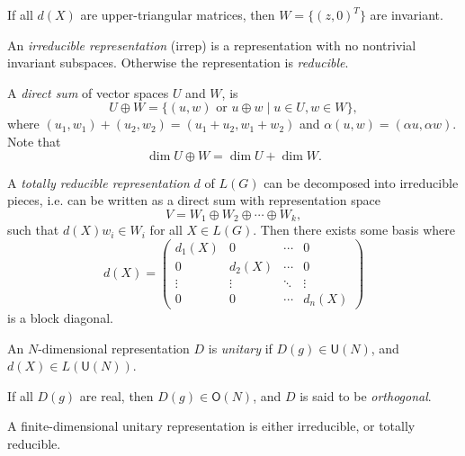 \documentclass[12pt]{article}
\begin{document}
\begin{exbox}
	If all $d(X)$ are upper-triangular matrices, then $W = \{(z, 0)^{T}\}$ are invariant.
\end{exbox}

\begin{definition}
	An \emph{irreducible representation} (irrep) is a representation with no nontrivial invariant subspaces. Otherwise the representation is \emph{reducible}.
\end{definition}

\begin{definition}
	A \emph{direct sum} of vector spaces $U$ and $W$, is
	\[
		U \oplus W = \{(u, w) \text{ or } u \oplus w \mid u \in U, w \in W\},
	\]
	where $(u_1, w_1) + (u_2, w_2) = (u_1 + u_2, w_1 + w_2)$ and $\alpha(u, w) = (\alpha u, \alpha w)$. Note that
	\[
	\dim U \oplus W = \dim U + \dim W.
	\]
\end{definition}

\begin{definition}
	A \emph{totally reducible representation} $d$ of $L(G)$ can be decomposed into irreducible pieces, i.e. can be written as a direct sum with representation space
	\[
	V = W_1 \oplus W_2 \oplus \cdots \oplus W_k,
	\]
	such that $d(X) w_i \in W_i$ for all $X \in L(G)$. Then there exists some basis where
	\[
	d(X) =
	\begin{pmatrix}
		d_1(X) & 0 & \cdots & 0 \\
		0 & d_2(X) & \cdots & 0 \\
		\vdots & \vdots & \ddots & \vdots \\
		0 & 0 & \cdots & d_n(X)
	\end{pmatrix}
	\]
	is a block diagonal.
\end{definition}

\begin{definition}
	An $N$-dimensional representation $D$ is \emph{unitary} if $D(g) \in \mathsf{U}(N)$, and $d(X) \in L(\mathsf{U}(N))$.

	If all $D(g)$ are real, then $D(g) \in \mathsf{O}(N)$, and $D$ is said to be \emph{orthogonal}.
\end{definition}

\begin{theorem}[Maschke]
	A finite-dimensional unitary representation is either irreducible, or totally reducible.
\end{theorem}
\end{document}
